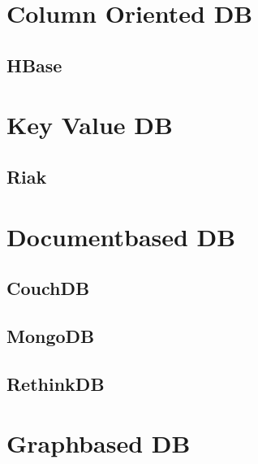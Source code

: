 \part{Column Oriented DB}
\chapter{HBase}


\part{Key Value DB}
\chapter{Riak}





\part{Documentbased DB}
 
\chapter{CouchDB}

%
%
%
%

\chapter{MongoDB}







\chapter{RethinkDB}



\part{Graphbased DB}

